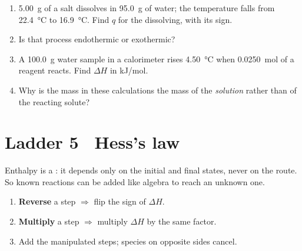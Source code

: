 \documentclass{apchem-worksheet}
\begin{document}
\begin{yourturn}
\begin{enumerate}[leftmargin=*,itemsep=0.5em]
  \item \SI{5.00}{\gram} of a salt dissolves in \SI{95.0}{\gram} of
        water; the temperature falls from \SI{22.4}{\celsius} to
        \SI{16.9}{\celsius}. Find $q$ for the dissolving, with its sign.
        \workspace[1.8cm]
  \item Is that process endothermic or exothermic? \workspace[1.2cm]
  \item A \SI{100.0}{\gram} water sample in a calorimeter rises
        \SI{4.50}{\celsius} when \SI{0.0250}{\mole} of a reagent reacts.
        Find $\Delta H$ in kJ/mol. \workspace[2cm]
  \item Why is the mass in these calculations the mass of the
        \emph{solution} rather than of the reacting solute?
        \workspace[1.6cm]
\end{enumerate}
\end{yourturn}

\section*{\sffamily Ladder 5 \textbullet\ Hess's law}

Enthalpy is a : it depends only on the initial and
final states, never on the route. So known reactions can be added like
algebra to reach an unknown one.

\begin{enumerate}[leftmargin=*,itemsep=0.15em]
  \item \textbf{Reverse} a step $\Rightarrow$ flip the sign of
        $\Delta H$.
  \item \textbf{Multiply} a step $\Rightarrow$ multiply $\Delta H$ by the
        same factor.
  \item Add the manipulated steps; species on opposite sides cancel.
\end{enumerate}
\end{document}
